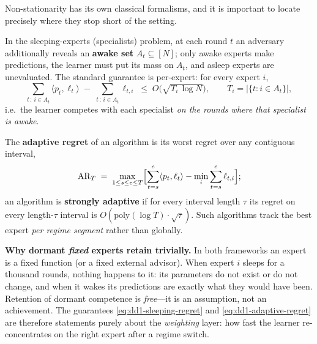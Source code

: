 Non-stationarity has its own classical formalisms, and it is important to
locate precisely where they stop short of the \nm{} setting.

\begin{definition}
\label{def:dd1-sleeping}
In the sleeping-experts (specialists) problem, at each round $t$ an
adversary additionally reveals an \textbf{awake set} $A_t \subseteq [N]$;
only awake experts make predictions, the learner must put its mass on $A_t$,
and asleep experts are unevaluated. The standard guarantee is per-expert: for
every expert $i$,
\begin{equation}
\label{eq:dd1-sleeping-regret}
\sum_{t \,:\, i \in A_t} \langle p_t, \ell_t \rangle
\;-\; \sum_{t \,:\, i \in A_t} \ell_{t,i}
\;\le\; O\bigl( \sqrt{ T_i \,\log N } \bigr),
\qquad T_i = |\{ t : i \in A_t \}|,
\end{equation}
i.e.\ the learner competes with each specialist \emph{on the rounds where
that specialist is awake}.
\end{definition}

\begin{definition}
\label{def:dd1-adaptive}
The \textbf{adaptive regret} of an algorithm is its worst regret over any
contiguous interval,
\begin{equation}
\label{eq:dd1-adaptive-regret}
\mathrm{AR}_T \;=\; \max_{1 \le s \le e \le T}
\Bigl[ \sum_{t=s}^{e} \langle p_t, \ell_t \rangle
- \min_{i} \sum_{t=s}^{e} \ell_{t,i} \Bigr];
\end{equation}
an algorithm is \textbf{strongly adaptive} \cite{daniely2015strongly} if for
every interval length $\tau$ its regret on every length-$\tau$ interval is
$O(\mathrm{poly}(\log T) \cdot \sqrt{\tau})$. Such algorithms track the best
expert \emph{per regime segment} rather than globally.
\end{definition}

\begin{keypoint}
\textbf{Why dormant \emph{fixed} experts retain trivially.} In both
frameworks an expert is a fixed function (or a fixed external advisor). When
expert $i$ sleeps for a thousand rounds, nothing happens to it: its
parameters do not exist or do not change, and when it wakes its predictions
are exactly what they would have been. Retention of dormant competence is
\emph{free}---it is an assumption, not an achievement. The guarantees
\eqref{eq:dd1-sleeping-regret} and \eqref{eq:dd1-adaptive-regret} are
therefore statements purely about the \emph{weighting} layer: how fast the
learner re-concentrates on the right expert after a regime switch.
\end{keypoint}

